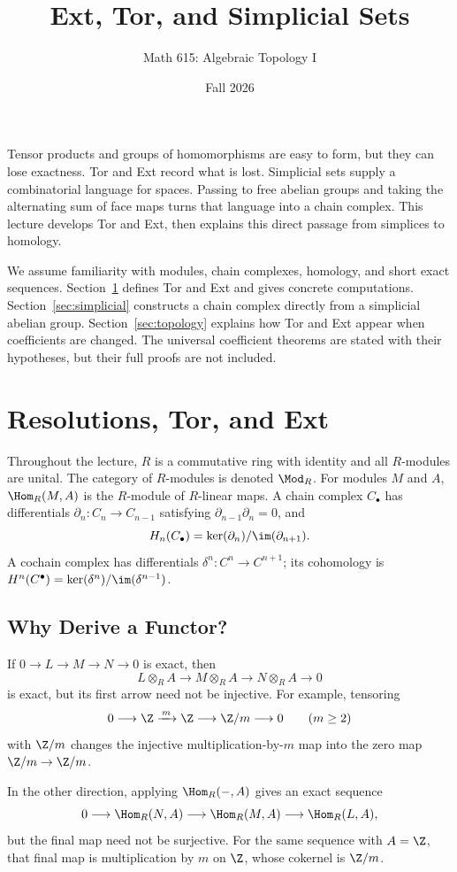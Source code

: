\documentclass[11pt]{article}
\title{\color{teal}\bfseries Ext, Tor, and Simplicial Sets}
\author{Math 615: Algebraic Topology I}
\date{Fall 2026}
\begin{document}
\maketitle
\noindent
Tensor products and groups of homomorphisms are easy to form, but they can lose exactness. Tor and Ext record what is lost. Simplicial sets supply a combinatorial language for spaces. Passing to free abelian groups and taking the alternating sum of face maps turns that language into a chain complex. This lecture develops Tor and Ext, then explains this direct passage from simplices to homology.

We assume familiarity with modules, chain complexes, homology, and short exact sequences. Section~\ref{sec:derived} defines Tor and Ext and gives concrete computations. Section~\ref{sec:simplicial} constructs a chain complex directly from a simplicial abelian group. Section~\ref{sec:topology} explains how Tor and Ext appear when coefficients are changed. The universal coefficient theorems are stated with their hypotheses, but their full proofs are not included.
\tableofcontents

\section{Resolutions, Tor, and Ext}\label{sec:derived}
Throughout the lecture, $R$ is a commutative ring with identity and all $R$-modules are unital. The category of $R$-modules is denoted $\Mod_R$. For modules $M$ and $A$, $\Hom_R(M,A)$ is the $R$-module of $R$-linear maps. A chain complex $C_\bullet$ has differentials $\partial_n:C_n\to C_{n-1}$ satisfying $\partial_{n-1}\partial_n=0$, and
\[
H_n(C_\bullet)=\ker(\partial_n)/\im(\partial_{n+1}).
\]
A cochain complex has differentials $\delta^n:C^n\to C^{n+1}$; its cohomology is $H^n(C^\bullet)=\ker(\delta^n)/\im(\delta^{n-1})$.

\subsection{Why Derive a Functor?}
If $0\to L\to M\to N\to0$ is exact, then
\[
L\otimes_R A\longrightarrow M\otimes_R A\longrightarrow N\otimes_R A\longrightarrow0
\]
is exact, but its first arrow need not be injective. For example, tensoring
\[
0\longrightarrow\Z\xrightarrow{\,m\,}\Z\longrightarrow\Z/m\longrightarrow0
\qquad(m\geq2)
\]
with $\Z/m$ changes the injective multiplication-by-$m$ map into the zero map $\Z/m\to\Z/m$.

In the other direction, applying $\Hom_R(-,A)$ gives an exact sequence
\[
0\longrightarrow\Hom_R(N,A)\longrightarrow\Hom_R(M,A)
\longrightarrow\Hom_R(L,A),
\]
but the final map need not be surjective. For the same sequence with $A=\Z$, that final map is multiplication by $m$ on $\Z$, whose cokernel is $\Z/m$.
\end{document}
